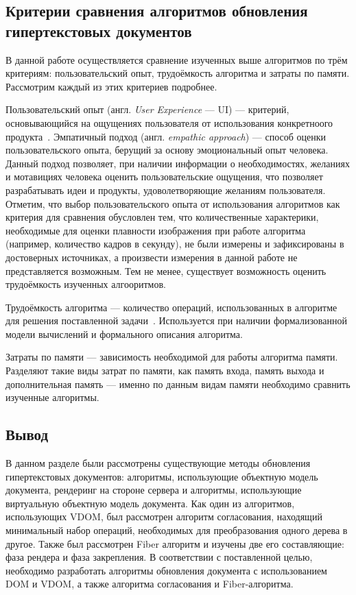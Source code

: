 \subsection{Критерии сравнения алгоритмов обновления гипертекстовых документов}

В данной работе осуществляется сравнение изученных выше алгоритмов по трём критериям: пользовательский опыт, трудоёмкость алгоритма и затраты по памяти. Рассмотрим каждый из этих критериев подробнее.

Пользовательский опыт (англ. \textit{User Experience} --- UI) --- критерий, основывающийся на ощущениях пользователя от использования конкретноого продукта~\cite{ui-definition}. Эмпатичный подход (англ. \textit{empathic approach}) --- способ оценки пользовательского опыта, берущий за основу эмоциональный опыт человека. Данный подход позволяет, при наличии информации о необходимостях, желаниях и мотавициях человека оценить пользовательские ощущения, что позволяет разрабатывать идеи и продукты, удоволетворяющие желаниям пользователя. Отметим, что выбор пользовательского опыта от использования алгоритмов как критерия для сравнения обусловлен тем, что количественные характерики, необходимые для оценки плавности изображения при работе алгоритма (например, количество кадров в секунду), не были измерены и зафиксированы в достоверных источниках, а произвести измерения в данной работе не представляется возможным. Тем не менее, существует возможность оценить трудоёмкость изученных алгооритмов.

Трудоёмкость алгоритма --- количество операций, использованных в алгоритме для решения поставленной задачи~\cite{model}. Используется при наличии формализованной модели вычислений и формального описания алгоритма.

Затраты по памяти --- зависимость необходимой для работы алгоритма памяти. Разделяют такие виды затрат по памяти, как память входа, память выхода и дополнительная память --- именно по данным видам памяти необходимо сравнить изученные алгоритмы.

\subsection*{Вывод}

В данном разделе были рассмотрены существующие методы обновления гипертекстовых документов: алгоритмы, использующие объектную модель документа, рендеринг на стороне сервера и алгоритмы, использующие виртуальную объектную модель документа.
Как один из алгоритмов, использующих \linebreak VDOM, был рассмотрен алгоритм согласования, находящий минимальный набор операций, необходимых для преобразования одного дерева в другое.
Также был рассмотрен Fiber алгоритм и изучены две его составляющие: фаза рендера и фаза закрепления.
В соответствии с поставленной целью, необходимо разработать алгоритмы обновления документа с использованием DOM и VDOM, а также алгоритма согласования и Fiber-алгоритма.

